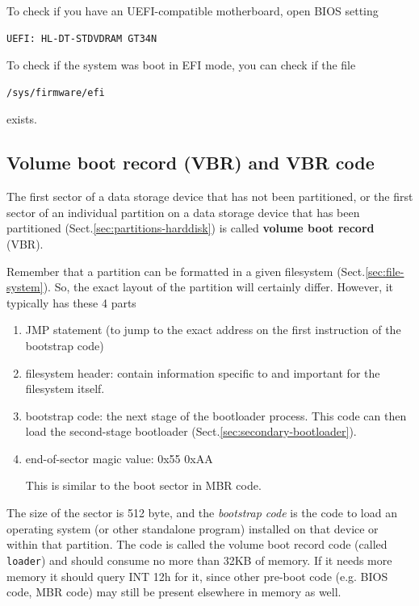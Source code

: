 To check if you have an UEFI-compatible motherboard, open BIOS setting
\begin{verbatim}
UEFI: HL-DT-STDVDRAM GT34N
\end{verbatim}

To check if the system was boot in EFI mode, you can check if the file 
\begin{verbatim}
/sys/firmware/efi
\end{verbatim}  
exists.

\subsection{Volume boot record (VBR) and VBR code}
\label{sec:volume-boot-code}
\label{sec:VBR-code}

The first sector of a data storage device that has not been partitioned, or the
first sector of an individual partition on a data storage device that has been
partitioned (Sect.\ref{sec:partitions-harddisk}) is called {\bf volume boot
record} (VBR). 

Remember that a partition can be formatted in a given filesystem
(Sect.\ref{sec:file-system}). So, the exact layout of the partition will
certainly differ. However, it typically has these 4 parts
\begin{enumerate}
  \item JMP statement (to jump to the exact address on the first instruction of
  the bootstrap code)
  
  \item filesystem header:  contain information specific to and important for
  the filesystem itself.
  
  \item bootstrap code: the next stage of the bootloader process. This code can
  then load the second-stage bootloader (Sect.\ref{sec:secondary-bootloader}).
  
  \item end-of-sector magic value: 0x55 0xAA
  
This is similar to the boot sector in MBR code.
\end{enumerate}

The size of the sector is 512 byte, and the {\it bootstrap code} is the code to
load an operating system (or other standalone program) installed on that device
or within that partition. The code is called the volume boot record code (called
\verb!loader!) and should consume no more than 32KB of memory. If it needs more
memory it should query INT 12h for it, since other pre-boot code (e.g. BIOS
code, MBR code) may still be present elsewhere in memory as well.

